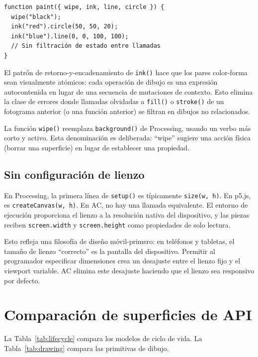 \documentclass[10pt,letterpaper,twocolumn]{article}
\begin{document}
\begin{lstlisting}[style=acjsstyle]
function paint({ wipe, ink, line, circle }) {
  wipe("black");
  ink("red").circle(50, 50, 20);
  ink("blue").line(0, 0, 100, 100);
  // Sin filtración de estado entre llamadas
}
\end{lstlisting}

El patrón de retorno-y-encadenamiento de \texttt{ink()} hace que los pares color-forma sean visualmente atómicos: cada operación de dibujo es una expresión autocontenida en lugar de una secuencia de mutaciones de contexto. Esto elimina la clase de errores donde llamadas olvidadas a \texttt{fill()} o \texttt{stroke()} de un fotograma anterior (o una función anterior) se filtran en dibujos no relacionados.

La función \texttt{wipe()} reemplaza \texttt{background()} de Processing, usando un verbo más corto y activo. Esta denominación es deliberada: ``wipe'' sugiere una acción física (borrar una superficie) en lugar de establecer una propiedad.

\subsection{Sin configuración de lienzo}

En Processing, la primera línea de \texttt{setup()} es típicamente \texttt{size(w, h)}. En p5.js, es \texttt{createCanvas(w, h)}. En AC, no hay una llamada equivalente. El entorno de ejecución proporciona el lienzo a la resolución nativa del dispositivo, y las piezas reciben \texttt{screen.width} y \texttt{screen.height} como propiedades de solo lectura.

Esto refleja una filosofía de diseño móvil-primero: en teléfonos y tabletas, el tamaño de lienzo ``correcto'' es la pantalla del dispositivo. Permitir al programador especificar dimensiones crea un desajuste entre el lienzo fijo y el viewport variable. AC elimina este desajuste haciendo que el lienzo sea responsivo por defecto.


\section{Comparación de superficies de API}
\label{sec:comparison}

La Tabla~\ref{tab:lifecycle} compara los modelos de ciclo de vida. La Tabla~\ref{tab:drawing} compara las primitivas de dibujo.
\end{document}
